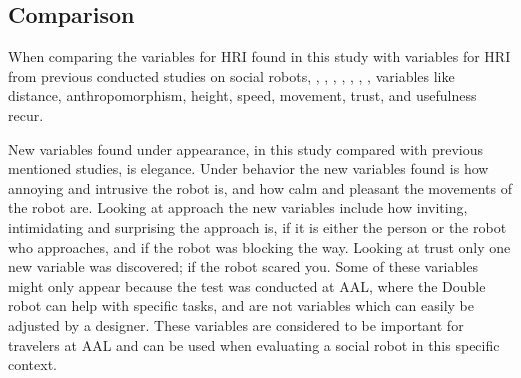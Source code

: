 \subsection{Comparison}
When comparing the variables for HRI found in this study with variables for HRI from previous conducted studies on social robots, \cite{PDF:TheImpactOfTraveler}, \cite{PDF:SharingALifeHarvey}, \cite{PDF:ExploringInfluencingVariable}, \cite{PDF:CloseButNotStuck}, \cite{PDF:HowMayIServeYou}, \cite{PDF:HumanRobotEmodiedInteraction}, \cite{PDF:RecommendationEffects}, variables like distance, anthropomorphism, height, speed, movement, trust, and usefulness recur. 

New variables found under appearance, in this study compared with previous mentioned studies, is elegance. Under behavior the new variables found is how annoying and intrusive the robot is, and how calm and pleasant the movements of the robot are. Looking at approach the new variables include how inviting, intimidating and surprising the approach is, if it is either the person or the robot who approaches, and if the robot was blocking the way. Looking at trust only one new variable was discovered; if the robot scared you. Some of these variables might only appear because the test was conducted at AAL, where the Double robot can help with specific tasks, and are not variables which can easily be adjusted by a designer. These variables are considered to be important for travelers at AAL and can be used when evaluating a social robot in this specific context. 